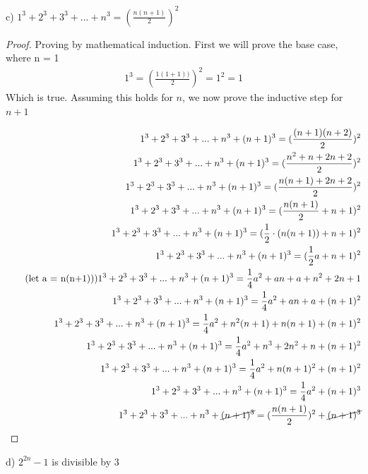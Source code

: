 \documentclass[]{report}
\begin{document}
c) $1^3 + 2^3 + 3^3 + ... + n^3 = (\frac{n(n+1)}{2})^2$

\begin{proof}
	Proving by mathematical induction.
	First we will prove the base case, where n = 1\\
	\begin{align*}
	1^3 = (\frac{1(1+1))}{2})^2 = 1^2 = 1
	\end{align*}
	Which is true. Assuming this holds for $n$, we now prove the inductive step for $n+1$
	
	\begin{align*}
		1^3 + 2^3 + 3^3 + ... + n^3 + (n+1)^3 = (\frac{(n+1)(n+2)}{2})^2\\
		1^3 + 2^3 + 3^3 + ... + n^3 + (n+1)^3 = (\frac{n^2 + n  + 2n + 2}{2})^2\\
		1^3 + 2^3 + 3^3 + ... + n^3 + (n+1)^3 = (\frac{n(n+1) + 2n + 2}{2})^2 \\
		1^3 + 2^3 + 3^3 + ... + n^3 + (n+1)^3 = (\frac{n(n+1)}{2} + n+1)^2 \\
		1^3 + 2^3 + 3^3 + ... + n^3 + (n+1)^3 = (\frac{1}{2}\cdot(n(n+1)) + n+1)^2\\
		1^3 + 2^3 + 3^3 + ... + n^3 + (n+1)^3 = (\frac{1}{2}a + n+1)^2\\ \tag{let a = n(n+1))}
		1^3 + 2^3 + 3^3 + ... + n^3 + (n+1)^3 = \frac{1}{4}a^2 + an +  a + n^2 + 2n + 1\\
		1^3 + 2^3 + 3^3 + ... + n^3 + (n+1)^3 = \frac{1}{4}a^2 + an +  a + (n+1)^2\\
		1^3 + 2^3 + 3^3 + ... + n^3 + (n+1)^3 = \frac{1}{4}a^2 + n^2(n+1) + n(n+1) + (n+1)^2\\
		1^3 + 2^3 + 3^3 + ... + n^3 + (n+1)^3 = \frac{1}{4}a^2 + n^3 + 2n^2 + n + (n+1)^2\\
		1^3 + 2^3 + 3^3 + ... + n^3 + (n+1)^3 = \frac{1}{4}a^2 + n(n+1)^2 + (n+1)^2 \\
		1^3 + 2^3 + 3^3 + ... + n^3 + (n+1)^3 = \frac{1}{4}a^2  + (n+1)^3 \\
		1^3 + 2^3 + 3^3 + ... + n^3 + \cancel{(n+1)^3} = (\frac{n(n+1)}{2})^2 + \cancel{(n+1)^3} \\
	\end{align*}
\end{proof}

d) $2^{2n} - 1$ is divisible by 3
\end{document}
